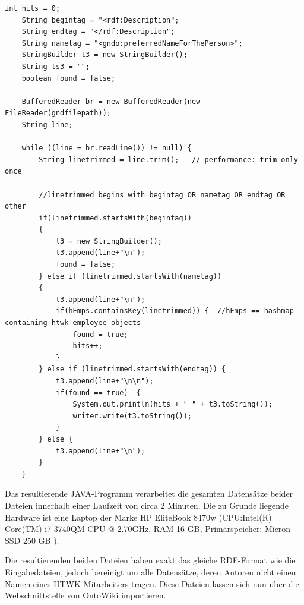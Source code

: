 \documentclass[parskip]{scrartcl}
\begin{document}
\begin{lstlisting}[captionpos=b, caption=Auszug JAVA-Anwendung: RDF-Parser , label=Auszug JAVA-Anwendung RDF-Parser]
	int hits = 0;
	String begintag = "<rdf:Description";
	String endtag = "</rdf:Description";
	String nametag = "<gndo:preferredNameForThePerson>";
	StringBuilder t3 = new StringBuilder();
	String ts3 = "";
	boolean found = false;

	BufferedReader br = new BufferedReader(new FileReader(gndfilepath));
	String line;

	while ((line = br.readLine()) != null) {
		String linetrimmed = line.trim();	// performance: trim only once
		
		//linetrimmed begins with begintag OR nametag OR endtag OR other 
		if(linetrimmed.startsWith(begintag)) 
		{			
			t3 = new StringBuilder();
			t3.append(line+"\n");
			found = false;
		} else if (linetrimmed.startsWith(nametag)) 
		{
			t3.append(line+"\n");
			if(hEmps.containsKey(linetrimmed)) {  //hEmps == hashmap containing htwk employee objects
				found = true;
				hits++;
			}
		} else if (linetrimmed.startsWith(endtag)) {
			t3.append(line+"\n\n");
			if(found == true)  {
				System.out.println(hits + " " + t3.toString());
				writer.write(t3.toString());
			}
		} else {
			t3.append(line+"\n");
		}
	}
\end{lstlisting}

Das resultierende JAVA-Programm verarbeitet die gesamten Datensätze beider Dateien innerhalb einer Laufzeit von circa 2 Minuten. Die zu Grunde liegende Hardware ist eine Laptop der Marke HP EliteBook 8470w (CPU:Intel(R) Core(TM) i7-3740QM CPU @ 2.70GHz, RAM 16 GB, Primärspeicher: Micron SSD 250 GB ).

Die resultierenden beiden Dateien haben exakt das gleiche RDF-Format wie die Eingabedateien, jedoch bereinigt um alle Datensätze, deren Autoren nicht einen Namen eines HTWK-Mitarbeiters tragen. Diese Dateien lassen sich nun über die Webschnittstelle von OntoWiki importieren.
\end{document}
